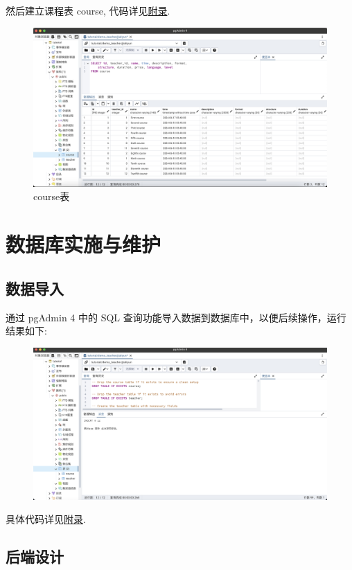 \documentclass[12pt, oneside]{ctexart}
\numberwithin{figure}{section}
\numberwithin{table}{section}
\begin{document}
然后建立课程表 course, 代码详见\hyperref[course_query]{附录}.
\begin{figure}[!htbp]
    \centering
    \includegraphics[width=13cm]{images/sec4/course.png}
    \caption{course表}
\end{figure}

\section{数据库实施与维护}

\subsection{数据导入}

通过 pgAdmin 4 中的 SQL 查询功能导入数据到数据库中，以便后续操作，运行结果如下:
\begin{figure}[!htbp]
    \centering
    \includegraphics[width=13cm]{images/sec5/Init_DB.png}
\end{figure}

具体代码详见\hyperref[init_db]{附录}.

\subsection{后端设计}
\end{document}
